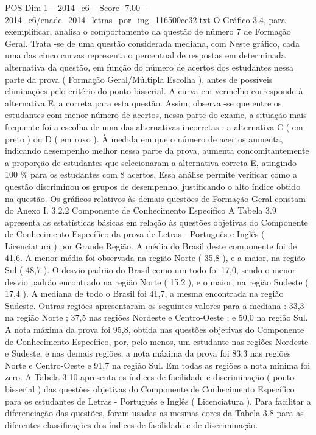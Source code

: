 \begin{textsample}{POS Dim 1 – 2014\_c6 – Score -7.00 – 2014\_c6/enade\_2014\_letras\_por\_ing\_116500ce32.txt}
O Gráfico 3.4, para exemplificar, analisa o comportamento da questão de número 7 de Formação Geral.
Trata -se de uma questão considerada mediana, com Neste gráfico, cada uma das cinco curvas representa o percentual de respostas em determinada alternativa da questão, em função do número de acertos dos estudantes nessa parte da prova ( Formação Geral/Múltipla Escolha ), antes de possíveis eliminações pelo critério do ponto bisserial.
A curva em vermelho corresponde à alternativa E, a correta para esta questão.
Assim, observa -se que entre os estudantes com menor número de acertos, nessa parte do exame, a situação mais frequente foi a escolha de uma das alternativas incorretas : a alternativa C ( em preto ) ou D ( em roxo ).
À medida em que o número de acertos aumenta, indicando desempenho melhor nessa parte da prova, aumenta concomitantemente a proporção de estudantes que selecionaram a alternativa correta E, atingindo 100 \% para os estudantes com 8 acertos.
Essa análise permite verificar como a questão discriminou os grupos de desempenho, justificando o alto índice obtido na questão.
Os gráficos relativos às demais questões de Formação Geral constam do Anexo I. 3.2.2 Componente de Conhecimento Específico A Tabela 3.9 apresenta as estatísticas básicas em relação às questões objetivas do Componente de Conhecimento Específico da prova de Letras - Português e Inglês ( Licenciatura ) por Grande Região.
A média do Brasil deste componente foi de 41,6.
A menor média foi observada na região Norte ( 35,8 ), e a maior, na região Sul ( 48,7 ).
O desvio padrão do Brasil como um todo foi 17,0, sendo o menor desvio padrão encontrado na região Norte ( 15,2 ), e o maior, na região Sudeste ( 17,4 ).
A mediana de todo o Brasil foi 41,7, a mesma encontrada na região Sudeste.
Outras regiões apresentaram os seguintes valores para a mediana : 33,3 na região Norte ; 37,5 nas regiões Nordeste e Centro-Oeste ; e 50,0 na região Sul.
A nota máxima da prova foi 95,8, obtida nas questões objetivas do Componente de Conhecimento Específico, por, pelo menos, um estudante nas regiões Nordeste e Sudeste, e nas demais regiões, a nota máxima da prova foi 83,3 nas regiões Norte e Centro-Oeste e 91,7 na região Sul.
Em todas as regiões a nota mínima foi zero.
A Tabela 3.10 apresenta os índices de facilidade e discriminação ( ponto bisserial ) das questões objetivas do Componente de Conhecimento Específico para os estudantes de Letras - Português e Inglês ( Licenciatura ).
Para facilitar a diferenciação das questões, foram usadas as mesmas cores da Tabela 3.8 para as diferentes classificações dos índices de facilidade e de discriminação.

\end{textsample}
